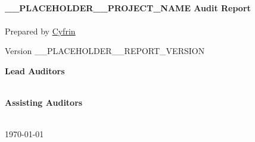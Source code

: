 \newlength{\logoWidth}
\setlength{\logoWidth}{0.6\textwidth}

\begin{titlepage}
  \vbox{}
  \vbox{}

  \begin{center}
  
    \ifdim\pagegoal>\maxdimen
      \vspace*{2cm} %
      \noindent\makebox[\linewidth]{\rule{.7\paperwidth}{.6pt}}\\[0.7cm]
      {\huge \bfseries Summary of Findings}\\
      \noindent\makebox[\linewidth]{\rule{.7\paperwidth}{.6pt}}\\[0.7cm]
      \normalsize %
      
      \texttt{[image: img/cyfrin-logo.png]} %
      
      \vfill
      \else
      \vfill
      
      \texttt{[image: img/cyfrin-logo.png]} %
      
      \vfill
    \fi

    \noindent\makebox[\linewidth]{\rule{.7\paperwidth}{.6pt}}\\[0.7cm]

    {\huge \bfseries
      __PLACEHOLDER__PROJECT_NAME Audit Report
    }\\[0.25cm]
    
    \noindent\makebox[\linewidth]{\rule{.7\paperwidth}{.6pt}}\\[0.7cm]

    \large
    Prepared by \href{https://cyfrin.io}{Cyfrin}

    \large{
      Version __PLACEHOLDER__REPORT_VERSION
    }\\[1.2cm]
    
    \vfill

    \large
    {\bfseries Lead Auditors}\\

    \vspace{0.2cm}
    \\
    \vspace{1cm}


    \large
    {\bfseries Assisting Auditors}\\

    \vspace{0.2cm}
    \\
    \vspace{1cm}

    \bigbreak
    \vfill
    
    {\normalsize \today}

  \end{center}

\end{titlepage}
